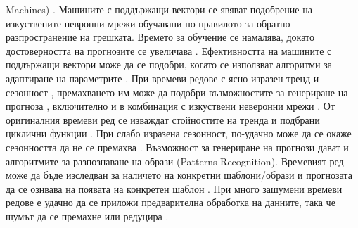 Machines) \cite{Kyoung-jae-01}. Машините с поддържащи вектори се явяват подобрение на изкуствените невронни мрежи обучавани по правилото за обратно разпространение на грешката. Времето за обучение се намалява, докато достоверността на прогнозите се увеличава \cite{Tay-01}. Ефективността на машините с поддържащи вектори може да се подобри, когато се използват алгоритми за адаптиране на параметрите \cite{Cao-01}. При времеви редове с ясно изразен тренд и сезонност \cite{Zhang-04}, премахването им може да подобри възможностите за генериране на прогноза \cite{Zhang-02}, включително и в комбинация с изкуствени неверонни мрежи \cite{Jain-01}. От оригиналния времеви ред се изваждат стойностите на тренда и подбрани циклични функции \cite{Nelson-01}. При слабо изразена сезонност, по-удачно може да се окаже сезонността да не се премахва \cite{Hamzacebi-01}. Възможност за генериране на прогнози дават и алгоритмите за разпознаване на образи (Patterns Recognition). Времевият ред може да бъде изследван за наличето на конкретни шаблони/образи и прогнозата да се ознвава на появата на конкретен шаблон \cite{Singh-01}. При много зашумени времеви редове е удачно да се приложи предварителна обработка на данните, така че шумът да се премахне или редуцира \cite{Lu-01}.

